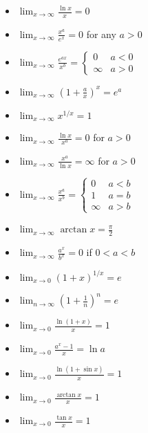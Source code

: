 \begin{cascade}
	\begin{itemize}
		\item $\displaystyle \lim_{x \to \infty} \frac{\ln x}{x} = 0$
		\item $\displaystyle \lim_{x \to \infty} \frac{x^a}{e^x} = 0$ for any $a > 0$
		\item $\displaystyle \lim_{x \to \infty} \frac{e^{ax}}{x^b} = \begin{cases}
				      0      & a < 0 \\
				      \infty & a > 0
			      \end{cases}$
		\item $\displaystyle \lim_{x \to \infty} \left(1 + \frac{a}{x}\right)^x = e^a$
		\item $\displaystyle \lim_{x \to \infty} x^{1/x} = 1$
		\item $\displaystyle \lim_{x \to \infty} \frac{\ln x}{x^a} = 0$ for $a > 0$
		\item $\displaystyle \lim_{x \to \infty} \frac{x^a}{\ln x} = \infty$ for $a > 0$
		\item $\displaystyle \lim_{x \to \infty} \frac{x^a}{x^b} = \begin{cases}
				      0      & a < b \\
				      1      & a = b \\
				      \infty & a > b
			      \end{cases}$
		\item $\displaystyle \lim_{x \to \infty} \arctan x = \frac{\pi}{2}$
		\item $\displaystyle \lim_{x \to \infty} \frac{a^x}{b^x} = 0$ if $0 < a < b$
	\end{itemize}
\end{cascade}

\begin{cascade}
	\begin{itemize}
		\item $\displaystyle \lim_{x \to 0} (1 + x)^{1/x} = e$
		\item $\displaystyle \lim_{n \to \infty} \left(1 + \frac{1}{n}\right)^n = e$
		\item $\displaystyle \lim_{x \to 0} \frac{\ln(1+x)}{x} = 1$
		\item $\displaystyle \lim_{x \to 0} \frac{a^x - 1}{x} = \ln a$
		\item $\displaystyle \lim_{x \to 0} \frac{\ln(1+\sin x)}{x} = 1$
		\item $\displaystyle \lim_{x \to 0} \frac{\arctan x}{x} = 1$
		\item $\displaystyle \lim_{x \to 0} \frac{\tan x}{x} = 1$
	\end{itemize}
\end{cascade}

